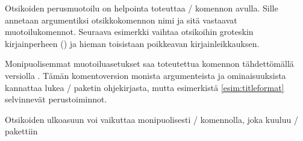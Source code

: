 Otsikoiden perusmuotoilu on helpointa toteuttaa
\-/ komennon avulla. Sille annetaan argumentiksi
otsikkokomennon nimi ja sitä vastaavat muotoilukomennot. Seuraava
esimerkki vaihtaa otsikoihin groteskin kirjainperheen
() ja hieman toisistaan poikkeavan kirjainleikkauksen.

\begin{koodilohkosis}
\titleformat*{\section}      {\sffamily\bfseries\Large}
\titleformat*{\subsection}   {\sffamily\bfseries\itshape\large}
\titleformat*{\subsubsection}{\sffamily\bfseries\normalsize}
\end{koodilohkosis}

Monipuolisemmat muotoiluasetukset saa toteutettua komennon tähdettömällä
versiolla . Tämän komentoversion monista
argumenteista ja ominaisuuksista kannattaa lukea \-/
paketin ohjekirjasta, mutta esimerkistä \ref{esim:titleformat}
selvinnevät perustoiminnot.

\begin{esimerkki*}

\begin{koodilohko}
\titleformat{\section}     %
[hang]                     %
{\sffamily\bfseries\Large  %
  \raggedright}
{\thesection}              %
{.8em}                     %
{}                         %
[]                         %
\end{koodilohko}
  \caption{Otsikoiden ulkoasuun voi vaikuttaa monipuolisesti
    \-/ komennolla, joka kuuluu \-/
    pakettiin}
  \label{esim:titleformat}
\end{esimerkki*}

